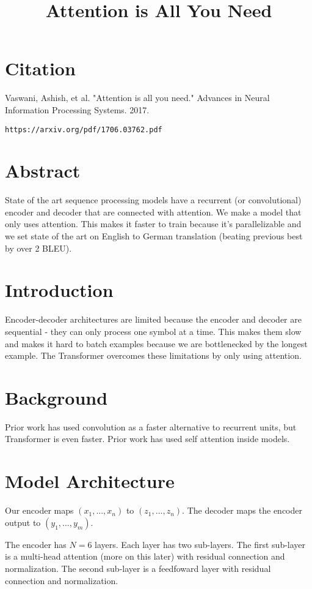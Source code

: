 \documentclass[a4paper]{article}
\title{Attention is All You Need}
\date{}
\begin{document}
\maketitle

\section{Citation}
Vaswani, Ashish, et al. "Attention is all you need." Advances in Neural Information Processing Systems. 2017.

\begin{verbatim}
https://arxiv.org/pdf/1706.03762.pdf
\end{verbatim}

\section{Abstract}
State of the art sequence processing models have a recurrent (or convolutional)
encoder and decoder that are connected with attention. We make a model that only
uses attention. This makes it faster to train because it's parallelizable and
we set state of the art on English to German translation (beating previous
best by over 2 BLEU).

\section{Introduction}
Encoder-decoder architectures are limited because the encoder and decoder are
sequential - they can only process one symbol at a time. This makes them slow
and makes it hard to batch examples because we are bottlenecked by the longest
example. The Transformer overcomes these limitations by only using attention.

\section{Background}
Prior work has used convolution as a faster alternative to recurrent units,
but Transformer is even faster. Prior work has used self attention inside
models.

\section{Model Architecture}
Our encoder maps $(x_1, ..., x_n)$ to $(z_1, ..., z_n)$. The decoder maps the
encoder output to $(y_1, ..., y_m)$.

The encoder has $N = 6$ layers. Each layer has two sub-layers. The first
sub-layer is a multi-head attention (more on this later) with residual
connection and normalization. The second sub-layer is a feedfoward layer with
residual connection and normalization.
\end{document}
